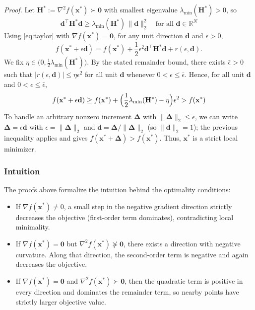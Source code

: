 \emph{Proof.}
Let $\mathbf{H}^* := \nabla^2 f(\mathbf{x}^*) \succ \mathbf{0}$ with smallest eigenvalue $\lambda_{\min}(\mathbf{H}^*)>0$, so
\begin{equation}
    \mathbf{d}^\top \mathbf{H}^* \mathbf{d} \ge \lambda_{\min}(\mathbf{H}^*)\, \|\mathbf{d}\|_2^2 \quad \text{for all }\mathbf{d}\in\mathbb{R}^N
    \label{eq:pd-bound}
\end{equation}
Using \autoref{eq:taylor} with $\nabla f(\mathbf{x}^*)=\mathbf{0}$, for any unit direction $\mathbf{d}$ and $\epsilon>0$,
\begin{equation}
f(\mathbf{x}^* + \epsilon \mathbf{d})
= f(\mathbf{x}^*) + \frac{1}{2}\epsilon^2 \mathbf{d}^\top \mathbf{H}^* \mathbf{d} + r(\epsilon,\mathbf{d}).
\end{equation}
We fix $\eta \in \bigl(0, \tfrac{1}{2}\lambda_{\min}(\mathbf{H}^*)\bigr)$. By the stated remainder bound, there exists $\bar{\epsilon}>0$ such that $|r(\epsilon,\mathbf{d})|\le \eta \epsilon^2$ for all unit $\mathbf{d}$ whenever $0<\epsilon\le \bar{\epsilon}$. Hence, for all unit $\mathbf{d}$ and $0<\epsilon\le\bar{\epsilon}$,
\begin{equation}
f(\mathbf{x}^* + \epsilon \mathbf{d})
\ge f(\mathbf{x}^*) + \Bigl(\frac{1}{2}\lambda_{\min}(\mathbf{H}^*) - \eta\Bigr)\epsilon^2
> f(\mathbf{x}^*)
\end{equation}
To handle an arbitrary nonzero increment $\boldsymbol{\Delta}$ with $\|\boldsymbol{\Delta}\|_2 \le \bar{\epsilon}$, we can write $\boldsymbol{\Delta}=\epsilon \mathbf{d}$ with $\epsilon=\|\boldsymbol{\Delta}\|_2$ and $\mathbf{d}=\boldsymbol{\Delta}/\|\boldsymbol{\Delta}\|_2$ (so $\|\mathbf{d}\|_2=1$); the previous inequality applies and gives $f(\mathbf{x}^*+\boldsymbol{\Delta})>f(\mathbf{x}^*)$. Thus, $\mathbf{x}^*$ is a strict local minimizer.


\subsubsection{Intuition}
\label{sec:optimality-conditions-intuition}
The proofs above formalize the intuition behind the optimality conditions:
\begin{itemize}
\item If $\nabla f(\mathbf{x}^*)\neq 0$, a small step in the negative gradient direction strictly decreases the objective (first-order term dominates), contradicting local minimality.
\item If $\nabla f(\mathbf{x}^*)=\mathbf{0}$ but $\nabla^2 f(\mathbf{x}^*)\nsucceq \mathbf{0}$, 
there exists a direction with negative curvature. Along that direction, the second-order term is negative and again decreases the objective.
\item If $\nabla f(\mathbf{x}^*)=\mathbf{0}$ and $\nabla^2 f(\mathbf{x}^*)\succ \mathbf{0}$, 
then the quadratic term is positive in every direction and dominates the remainder term, so nearby points have strictly larger objective value.
\end{itemize}

